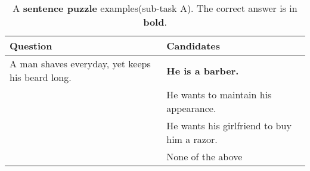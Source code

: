 \begin{table}
	\caption{A \textbf{sentence puzzle} examples(sub-task A). The correct answer is in \textbf{bold}.}
	\label{tab:sentence-puzzle-q}
	\begin{center}
		\begin{tabular}{|p{3.2cm}|p{3.5cm}|}
			\toprule
			Question                                         & Candidates                                  \\
			\midrule
			A man shaves everyday, yet keeps his beard long. & \textbf{He is a barber.}                    \\
			                                                 & He wants to maintain his appearance.        \\
			                                                 & He wants his girlfriend to buy him a razor. \\
			                                                 & None of the above                           \\
			\bottomrule
		\end{tabular}
	\end{center}
\end{table}

